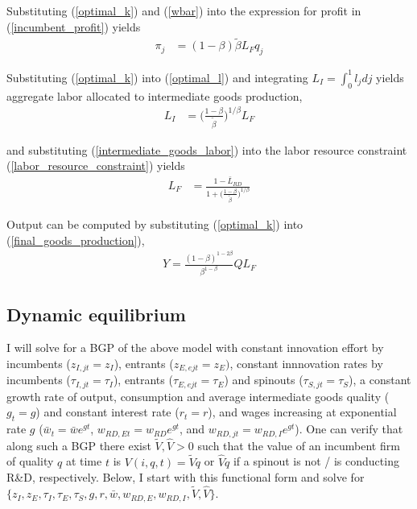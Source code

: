 \documentclass[12pt,english]{article}
\theoremstyle{remark}
\begin{document}
Substituting (\ref{optimal_k}) and (\ref{wbar}) into the expression for profit in (\ref{incumbent_profit}) yields
\begin{align}
\pi_j &= (1-\beta) \tilde{\beta} L_F q_j \label{profits_eq}
\end{align}

Substituting (\ref{optimal_k}) into (\ref{optimal_l}) and integrating $L_I = \int_0^1 l_j dj$ yields aggregate labor allocated to intermediate goods production,
\begin{align}
L_I &= \Big( \frac{1-\beta}{\tilde{\beta}} \Big)^{1 / \beta} L_F \label{intermediate_goods_labor}
\end{align}

and substituting (\ref{intermediate_goods_labor}) into the labor resource constraint (\ref{labor_resource_constraint}) yields
\begin{align}
L_F &= \frac{1 - \bar{L}_{RD}}{1 + \Big(\frac{1-\beta}{\tilde{\beta}}\Big)^{1/\beta}}
\end{align}

Output can be computed by substituting (\ref{optimal_k}) into (\ref{final_goods_production}), 
\begin{align}
Y = \frac{(1-\beta)^{1-2\beta}}{\beta^{1-\beta}} Q L_F \label{flow_output}
\end{align}

\subsection{Dynamic equilibrium}

I will solve for a BGP of the above model with constant innovation effort by incumbents ($z_{I,jt} = z_I$), entrants ($z_{E,ejt} = z_{E})$, constant innnovation rates by incumbents ($\tau_{I,jt} = \tau_I$), entrants ($\tau_{E,ejt} = \tau_E$) and spinouts ($\tau_{S,jt} = \tau_S$), a constant growth rate of output, consumption and average intermediate goods quality ($g_t = g$) and constant interest rate ($r_t = r$), and wages increasing at exponential rate $g$ ($\bar{w}_t = \bar{w} e^{gt}$, $w_{RD,Et} = w_{RD}e^{gt}$, and $w_{RD,jt} = w_{RD,I}e^{gt}$). One can verify that along such a BGP there exist $\tilde{V},\hat{V} > 0$ such that the value of an incumbent firm of quality $q$ at time $t$ is $V(i,q,t) = \tilde{V} q$ or $\hat{V}q$ if a spinout is not / is conducting R\&D, respectively. Below, I start with this functional form and solve for $\{z_I,z_E,\tau_I,\tau_E,\tau_S,g,r,\bar{w},w_{RD,E},w_{RD,I},\tilde{V}, \hat{V}\}$.
\end{document}
